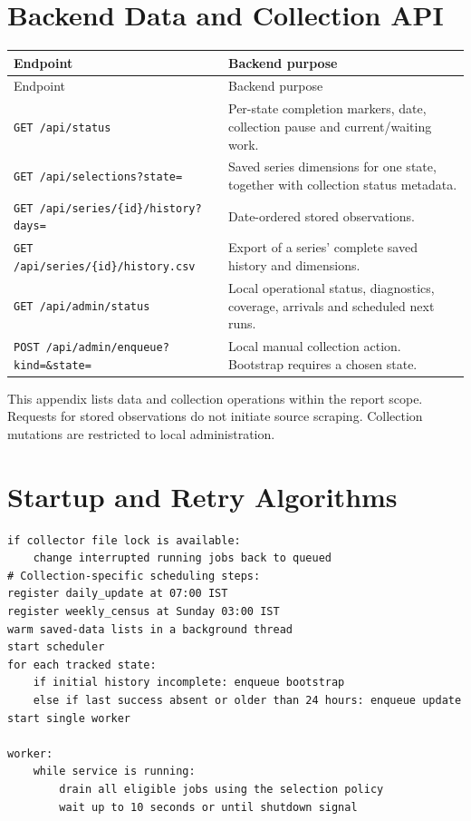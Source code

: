 \documentclass[12pt,a4paper,oneside]{report}
\numberwithin{equation}{chapter}
\numberwithin{figure}{chapter}
\numberwithin{table}{chapter}
\theoremstyle{definition}
\begin{document}
\chapter{Backend Data and Collection API}
\begin{longtable}{@{}p{}p{}@{}}
\toprule
Endpoint & Backend purpose \\
\midrule
\endfirsthead
\toprule
Endpoint & Backend purpose \\
\midrule
\endhead
\texttt{GET /api/status} & Per-state completion markers, date, collection pause and current/waiting work. \\
\texttt{GET /api/selections?state=} & Saved series dimensions for one state, together with collection status metadata. \\
\texttt{GET /api/series/\{id\}/history?days=} & Date-ordered stored observations. \\
\texttt{GET /api/series/\{id\}/history.csv} & Export of a series' complete saved history and dimensions. \\
\texttt{GET /api/admin/status} & Local operational status, diagnostics, coverage, arrivals and scheduled next runs. \\
\texttt{POST /api/admin/enqueue?kind=\&state=} & Local manual collection action. Bootstrap requires a chosen state. \\
\bottomrule
\end{longtable}

This appendix lists data and collection operations within the report scope. Requests for stored observations do not initiate source scraping. Collection mutations are restricted to local administration.

\chapter{Startup and Retry Algorithms}
\begin{lstlisting}[caption={Startup recovery and registration, simplified}]
if collector file lock is available:
    change interrupted running jobs back to queued
# Collection-specific scheduling steps:
register daily_update at 07:00 IST
register weekly_census at Sunday 03:00 IST
warm saved-data lists in a background thread
start scheduler
for each tracked state:
    if initial history incomplete: enqueue bootstrap
    else if last success absent or older than 24 hours: enqueue update
start single worker

worker:
    while service is running:
        drain all eligible jobs using the selection policy
        wait up to 10 seconds or until shutdown signal
\end{lstlisting}
\end{document}
